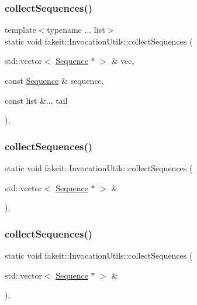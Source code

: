 \subsubsection{\texorpdfstring{collectSequences()}{collectSequences()}\hspace{0.1cm}{\footnotesize\ttfamily [4/18]}}
{\footnotesize\ttfamily template$<$typename ... list$>$ \\
static void fakeit\+::\+Invocation\+Utils\+::collect\+Sequences (\begin{DoxyParamCaption}\item[{std\+::vector$<$ \mbox{\hyperlink{classfakeit_1_1Sequence}{Sequence}} $\ast$ $>$ \&}]{vec,  }\item[{const \mbox{\hyperlink{classfakeit_1_1Sequence}{Sequence}} \&}]{sequence,  }\item[{const list \&...}]{tail }\end{DoxyParamCaption})\hspace{0.3cm}{\ttfamily [inline]}, {\ttfamily [static]}}

\mbox{\label{structfakeit_1_1InvocationUtils_ac2d11afbe797cdd0978cf42a25c4c1a6}} 
\subsubsection{\texorpdfstring{collectSequences()}{collectSequences()}\hspace{0.1cm}{\footnotesize\ttfamily [5/18]}}
{\footnotesize\ttfamily static void fakeit\+::\+Invocation\+Utils\+::collect\+Sequences (\begin{DoxyParamCaption}\item[{std\+::vector$<$ \mbox{\hyperlink{classfakeit_1_1Sequence}{Sequence}} $\ast$ $>$ \&}]{ }\end{DoxyParamCaption})\hspace{0.3cm}{\ttfamily [inline]}, {\ttfamily [static]}}

\mbox{\label{structfakeit_1_1InvocationUtils_ac2d11afbe797cdd0978cf42a25c4c1a6}} 
\subsubsection{\texorpdfstring{collectSequences()}{collectSequences()}\hspace{0.1cm}{\footnotesize\ttfamily [6/18]}}
{\footnotesize\ttfamily static void fakeit\+::\+Invocation\+Utils\+::collect\+Sequences (\begin{DoxyParamCaption}\item[{std\+::vector$<$ \mbox{\hyperlink{classfakeit_1_1Sequence}{Sequence}} $\ast$ $>$ \&}]{ }\end{DoxyParamCaption})\hspace{0.3cm}{\ttfamily [inline]}, {\ttfamily [static]}}

